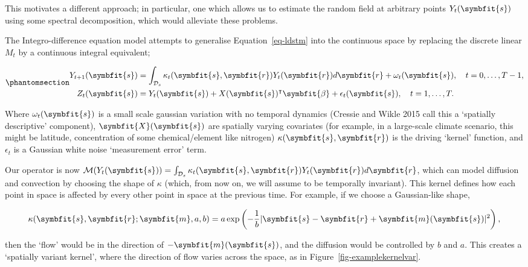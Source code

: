 \documentclass[
]{report}
\newcommand{\bv}[1]{\symbfit{#1}}
\theoremstyle{plain}
\theoremstyle{plain}
\theoremstyle{plain}
\theoremstyle{remark}
\begin{document}
This motivates a different approach; in particular, one which allows us
to estimate the random field at arbitrary points \(Y_t(\bv s)\) using
some spectral decomposition, which would alleviate these problems.

The Integro-difference equation model attempts to generalise
Equation~\ref{eq-ldstm} into the continuous space by replacing the
discrete linear \(M_t\) by a continuous integral equivalent;

\begin{equation}\phantomsection\label{eq-IDEM}{\begin{split}
  Y_{t+1}(\bv s) &= \int_{\mathcal D_s} \kappa_t(\bv s,\bv r) Y_t(\bv r) d\bv r + \omega_t(\bv s), \quad t=0, \dots, T-1, \\
  Z_t(\bv s) &= Y_t(\bv s) + X(\bv s)^{\intercal}\bv \beta + \epsilon_t(\bv s), \quad t=1,\dots,T.
\end{split}
}\end{equation}

Where \(\omega_t(\bv s)\) is a small scale gaussian variation with no
temporal dynamics (Cressie and Wikle 2015 call this a `spatially
descriptive' component), \(\bv X(\bv s)\) are spatially varying
covariates (for example, in a large-scale climate scenario, this might
be latitude, concentration of some chemical/element like nitrogen)
\(\kappa(\bv s, \bv r)\) is the driving `kernel' function, and
\(\epsilon_t\) is a Gaussian white noise `measurement error' term.

Our operator is now
\(\mathcal M(Y_t(\bv s)) = \int_{\mathcal D_s} \kappa_t(\bv s,\bv r) Y_t(\bv r) d\bv r\),
which can model diffusion and convection by choosing the shape of
\(\kappa\) (which, from now on, we will assume to be temporally
invariant). This kernel defines how each point in space is affected by
every other point in space at the previous time. For example, if we
choose a Gaussian-like shape,

\[\begin{split}
  \kappa(\bv s, \bv r; \bv m, a, b) = a \exp \left( -\frac{1}{b} \vert \bv s- \bv r +\bv m(\bv s)\vert^2 \right),
\end{split}
\]

then the `flow' would be in the direction of \(-\bv m(\bv s)\), and the
diffusion would be controlled by \(b\) and \(a\). This creates a
`spatially variant kernel', where the direction of flow varies across
the space, as in Figure~\ref{fig-examplekernelvar}.
\end{document}
